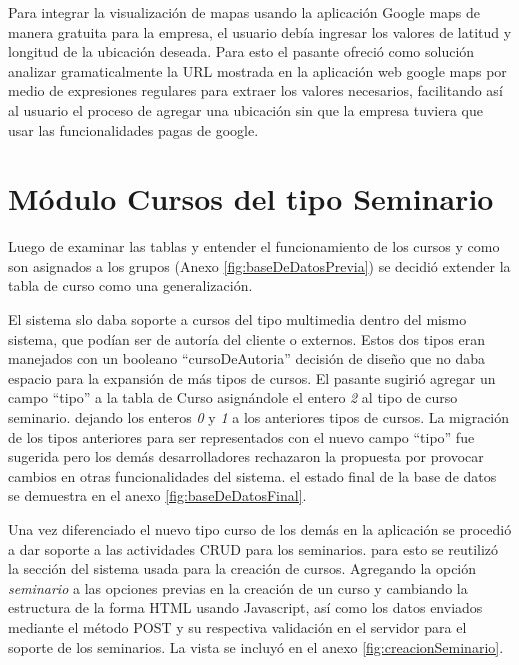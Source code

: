 	Para integrar la visualización de mapas usando la aplicación Google maps de manera gratuita para la empresa, el usuario debía ingresar los valores de latitud y longitud de la ubicación deseada. Para esto el pasante ofreció como solución analizar gramaticalmente la \gls{URL} mostrada en la aplicación web google maps por medio de expresiones regulares para extraer los valores necesarios, facilitando así al usuario el proceso de agregar una ubicación sin que la empresa tuviera que usar las funcionalidades pagas de google.


	\section{Módulo Cursos del tipo Seminario} %
	\label{sec:cursos_del_tipo_seminario}
	
	Luego de examinar las tablas y entender el funcionamiento de los cursos y como son asignados a los grupos (Anexo \ref{fig:baseDeDatosPrevia}) se decidió extender la tabla de curso como una generalización.

	El sistema slo daba soporte a cursos del tipo multimedia dentro del mismo sistema, que podían ser de autoría del cliente o externos. Estos dos tipos eran manejados con un booleano ``cursoDeAutoria'' decisión de diseño que no daba espacio para la expansión de más tipos de cursos. El pasante sugirió agregar un campo ``tipo'' a la tabla de Curso asignándole el entero \emph{2} al tipo de curso seminario. dejando los enteros \emph{0} y \emph{1} a los anteriores tipos de cursos. La migración de los tipos anteriores para ser representados con el nuevo campo ``tipo'' fue sugerida pero los demás desarrolladores rechazaron la propuesta por provocar cambios en otras funcionalidades del sistema. el estado final de la base de datos se demuestra en el anexo \ref{fig:baseDeDatosFinal}.

	Una vez diferenciado el nuevo tipo curso de los demás en la aplicación se procedió a dar soporte a las actividades \gls{CRUD} para los seminarios. para esto se reutilizó la sección del sistema usada para la creación de cursos. Agregando la opción \emph{seminario} a las opciones previas en la creación de un curso y cambiando la estructura de la forma \gls{HTML} usando Javascript, así como los datos enviados mediante el método POST y su respectiva validación en el servidor para el soporte de los seminarios. La vista se incluyó en el anexo \ref{fig:creacionSeminario}.

